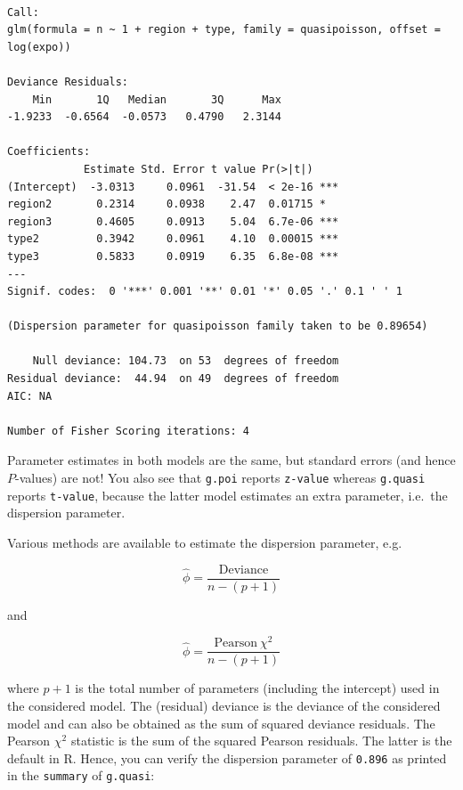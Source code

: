 \documentclass[
]{book}
\newenvironment{Shaded}{\begin{snugshade}}{\end{snugshade}}
\newcommand{\CommentTok}[1]{\textcolor[rgb]{0.56,0.35,0.01}{\textit{#1}}}
\newcommand{\DecValTok}[1]{\textcolor[rgb]{0.00,0.00,0.81}{#1}}
\newcommand{\KeywordTok}[1]{\textcolor[rgb]{0.13,0.29,0.53}{\textbf{#1}}}
\newcommand{\NormalTok}[1]{#1}
\newcommand{\OperatorTok}[1]{\textcolor[rgb]{0.81,0.36,0.00}{\textbf{#1}}}
\newcommand{\StringTok}[1]{\textcolor[rgb]{0.31,0.60,0.02}{#1}}
\begin{document}
\begin{verbatim}

Call:
glm(formula = n ~ 1 + region + type, family = quasipoisson, offset = log(expo))

Deviance Residuals: 
    Min       1Q   Median       3Q      Max  
-1.9233  -0.6564  -0.0573   0.4790   2.3144  

Coefficients:
            Estimate Std. Error t value Pr(>|t|)    
(Intercept)  -3.0313     0.0961  -31.54  < 2e-16 ***
region2       0.2314     0.0938    2.47  0.01715 *  
region3       0.4605     0.0913    5.04  6.7e-06 ***
type2         0.3942     0.0961    4.10  0.00015 ***
type3         0.5833     0.0919    6.35  6.8e-08 ***
---
Signif. codes:  0 '***' 0.001 '**' 0.01 '*' 0.05 '.' 0.1 ' ' 1

(Dispersion parameter for quasipoisson family taken to be 0.89654)

    Null deviance: 104.73  on 53  degrees of freedom
Residual deviance:  44.94  on 49  degrees of freedom
AIC: NA

Number of Fisher Scoring iterations: 4
\end{verbatim}

Parameter estimates in both models are the same, but standard errors (and hence \(P\)-values) are not! You also see that \texttt{g.poi} reports \texttt{z-value} whereas \texttt{g.quasi} reports \texttt{t-value}, because the latter model estimates an extra parameter, i.e.~the dispersion parameter.

Various methods are available to estimate the dispersion parameter, e.g.

\[ \hat{\phi} = \frac{\text{Deviance}}{n-(p+1)}\]

and

\[ \hat{\phi} = \frac{\text{Pearson}\ \chi^2}{n-(p+1)}\]

where \(p+1\) is the total number of parameters (including the intercept) used in the considered model. The (residual) deviance is the deviance of the considered model and can also be obtained as the sum of squared deviance residuals. The Pearson \(\chi^2\) statistic is the sum of the squared Pearson residuals. The latter is the default in R. Hence, you can verify the dispersion parameter of \texttt{0.896} as printed in the \texttt{summary} of \texttt{g.quasi}:

\begin{Shaded}
\end{Shaded}
\end{document}
